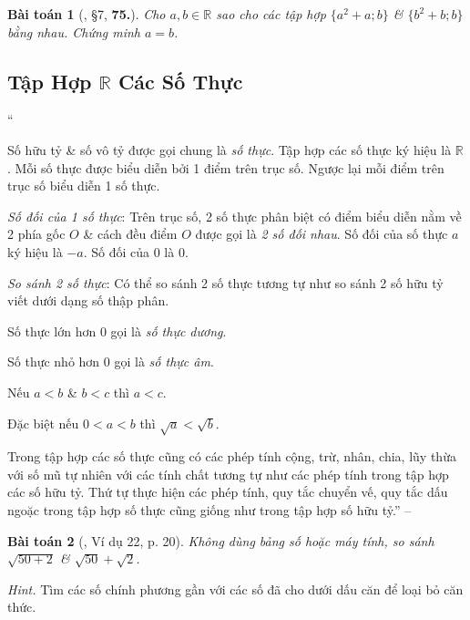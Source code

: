 \documentclass{article}
\numberwithin{equation}{section}
\newtheorem{baitoan}{Bài toán}
\begin{document}
\begin{baitoan}[\cite{Binh_Toan_7_tap_1}, \S7, \textbf{75.}]
	Cho $a,b\in\mathbb{R}$ sao cho các tập hợp $\{a^2 + a;b\}$ \& $\{b^2 + b;b\}$ bằng nhau. Chứng minh $a = b$.
\end{baitoan}


\subsection{Tập Hợp $\mathbb{R}$ Các Số Thực}
``\begin{enumerate*}
	\item[\textbf{1.}] Số hữu tỷ \& số vô tỷ được gọi chung là \textit{số thực}. Tập hợp các số thực ký hiệu là $\mathbb{R}$. Mỗi số thực được biểu diễn bởi 1 điểm trên trục số. Ngược lại mỗi điểm trên trục số biểu diễn 1 số thực.
	\item[\textbf{2.}] \textit{Số đối của 1 số thực}: Trên trục số, 2 số thực phân biệt có điểm biểu diễn nằm về 2 phía gốc $O$ \& cách đều điểm $O$ được gọi là \textit{2 số đối nhau}. Số đối của số thực $a$ ký hiệu là $-a$. Số đối của $0$ là $0$.
	\item[\textbf{3.}] \textit{So sánh 2 số thực}: Có thể so sánh 2 số thực tương tự như so sánh 2 số hữu tỷ viết dưới dạng số thập phân.
	\begin{enumerate*}
		\item[$\bullet$] Số thực lớn hơn $0$ gọi là \textit{số thực dương}.
		\item[$\bullet$] Số thực nhỏ hơn $0$ gọi là \textit{số thực âm}.
		\item[$\bullet$] Nếu $a < b$ \& $b < c$ thì $a < c$.
		\item[$\bullet$] Đặc biệt nếu $0 < a < b$ thì $\sqrt{a} < \sqrt{b}$.
	\end{enumerate*}
	\item[\textbf{4.}] Trong tập hợp các số thực cũng có các phép tính cộng, trừ, nhân, chia, lũy thừa với số mũ tự nhiên với các tính chất tương tự như các phép tính trong tập hợp các số hữu tỷ. Thứ tự thực hiện các phép tính, quy tắc chuyển vế, quy tắc dấu ngoặc trong tập hợp số thực cũng giống như trong tập hợp số hữu tỷ.'' -- \cite[Chap. 2, \S2, p. 20]{Tuyen_Toan_7}
\end{enumerate*}

\begin{baitoan}[\cite{Tuyen_Toan_7}, Ví dụ 22, p. 20]
	Không dùng bảng số hoặc máy tính, so sánh $\sqrt{50 + 2}$ \& $\sqrt{50} + \sqrt{2}$.
\end{baitoan}
\noindent\textit{Hint.} Tìm các số chính phương gần với các số đã cho dưới dấu căn để loại bỏ căn thức.
\end{document}
